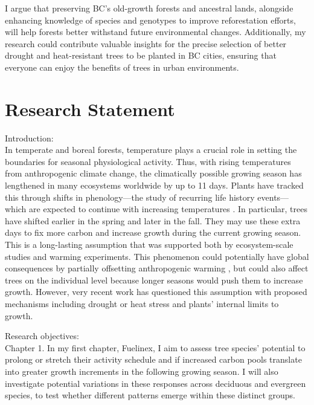 \documentclass[11pt,letter]{article}
\begin{document}
I argue that preserving BC's old-growth forests and ancestral lands, alongside enhancing knowledge of species and genotypes to improve reforestation efforts, will help forests better withstand future environmental changes. Additionally, my research could contribute valuable insights for the precise selection of better drought and heat-resistant trees to be planted in BC cities, ensuring that everyone can enjoy the benefits of trees in urban environments.
\section {Research Statement}
Introduction: \\
In temperate and boreal forests, temperature plays a crucial role in setting the boundaries for seasonal physiological activity. Thus, with rising temperatures from anthropogenic climate change, the climatically possible growing season has lengthened in many ecosystems worldwide by up to 11 days. \citep{korner_phenology_2010, menzel_growing_1999} Plants have tracked this through shifts in phenology—the study of recurring life history events—which are expected to continue with increasing temperatures \citep{wolkovich_warming_2012}. In particular, trees have shifted earlier in the spring and later in the fall. They may use these extra days to fix more carbon and increase growth during the current growing season. \citep{keenan_net_2014, wang_interactive_2020} This is a long-lasting assumption that was supported both by ecosystem-scale studies and warming experiments. This phenomenon could potentially have global consequences by partially offsetting anthropogenic warming \citep{friedlingstein_global_2023}, but could also affect trees on the individual level because longer seasons would push them to increase growth. \citep{grossiord_warming_2022} However, very recent work has questioned this assumption with proposed mechanisms including drought or heat stress and plants' internal limits to growth. \citep{dow_warm_2022,green_limits_2022} %

Research objectives:\\
Chapter 1. In my first chapter, Fuelinex, I aim to assess tree species’ potential to prolong or stretch their activity schedule and if increased carbon pools translate into greater growth increments in the following growing season. I will also investigate potential variations in these responses across deciduous and evergreen species, to test whether different patterns emerge within these distinct groups.\\
\end{document}
